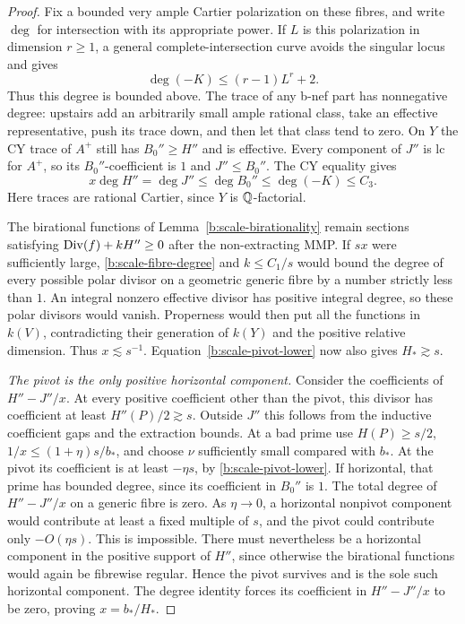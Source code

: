 \begin{proof}
Fix a bounded very ample Cartier polarization on these fibres, and
write $\deg$ for intersection with its appropriate power.  If $L$
is this polarization in dimension $r\ge1$, a general
complete-intersection curve avoids the singular locus and gives
\[
             \deg(-K)\le (r-1)L^r+2.
\]
Thus this degree is bounded above.  The trace of any b-nef part has
nonnegative degree: upstairs add an arbitrarily small ample rational
class, take an effective representative, push its trace down, and then
let that class tend to zero.  On $Y$ the CY trace of $A^+$ still has
$B_0''\ge H''$ and is effective.  Every component of $J''$ is lc for
$A^+$, so its $B_0''$-coefficient is $1$ and $J''\le B_0''$.
The CY equality gives
\begin{equation}\label{b:scale-fibre-degree}
        x\deg H''=\deg J''\le\deg B_0''\le\deg(-K)\le C_3.
\end{equation}
Here traces are rational Cartier, since $Y$ is $\mathbb Q$-factorial.

The birational functions of Lemma~\ref{b:scale-birationality} remain
sections satisfying $\operatorname{Div}(f)+kH''\ge0$ after the non-extracting MMP.
If $sx$ were sufficiently large, \eqref{b:scale-fibre-degree} and
$k\le C_1/s$ would bound the degree of every possible polar divisor
on a geometric generic fibre by a number strictly less than $1$.
An integral nonzero effective divisor has positive integral degree,
so these polar divisors would vanish.  Properness would then put all
the functions in $k(V)$, contradicting their generation of $k(Y)$
and the positive relative dimension.  Thus $x\lesssim s^{-1}$.
Equation~\eqref{b:scale-pivot-lower} now also gives $H_*\gtrsim s$.

\smallskip\noindent
\emph{The pivot is the only positive horizontal component.}
Consider the coefficients of $H''-J''/x$.  At every positive coefficient
other than the pivot, this divisor has coefficient at least
$H''(P)/2\gtrsim s$.  Outside $J''$ this follows from the inductive
coefficient gaps and the extraction bounds.  At a bad prime use
$H(P)\ge s/2$, $1/x\le(1+\eta)s/b_*$, and choose $\nu$ sufficiently
small compared with $b_*$.  At the pivot its coefficient is at least
$-\eta s$, by \eqref{b:scale-pivot-lower}.  If horizontal, that prime
has bounded degree, since its coefficient in $B_0''$ is $1$.
The total degree of $H''-J''/x$ on a generic fibre is zero.
As $\eta\to0$, a horizontal nonpivot component would contribute at
least a fixed multiple of $s$, and the pivot could contribute only
$-O(\eta s)$.  This is impossible.  There must nevertheless be a
horizontal component in the positive support of $H''$, since otherwise
the birational functions would again be fibrewise regular.  Hence the
pivot survives and is the sole such horizontal component.  The degree
identity forces its coefficient in $H''-J''/x$ to be zero, proving
$x=b_*/H_*$.


\end{proof}
